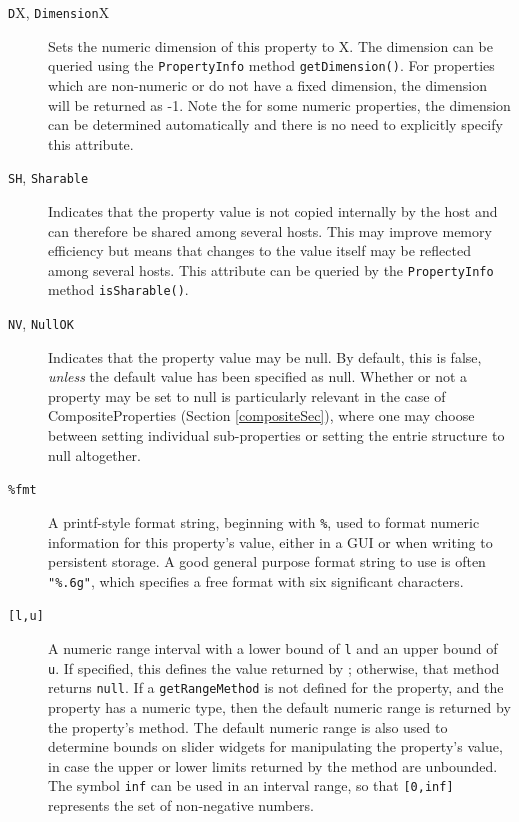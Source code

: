 \documentclass{article}
\begin{document}
\begin{description}
\item[{\tt D}X, {\tt Dimension}X] \mbox{}

Sets the numeric dimension of this
property to X. The dimension can be queried using the 
{\tt PropertyInfo} method {\tt getDimension()}. For properties which are
non-numeric or do not have a fixed dimension, the dimension will be
returned as -1. Note the for some numeric properties, the dimension
can be determined automatically and there is no need to explicitly
specify this attribute.

\item[{\tt SH}, {\tt Sharable}] \mbox{}

Indicates that the property value is
not copied internally by the host and can therefore be shared among
several hosts. This may improve memory efficiency but means that
changes to the value itself may be reflected among several hosts.
This attribute can be queried by the {\tt PropertyInfo} method 
{\tt isSharable()}.

\item[{\tt NV}, {\tt NullOK}] \mbox{}

Indicates that the property value 
may be null. By default, this is false, {\it unless} the
default value has been specified as null. Whether
or not a property may be set to null is particularly
relevant in the case of CompositeProperties (Section \ref{compositeSec}),
where one may choose between setting individual sub-properties or
setting the entrie structure to null altogether.

\item[{\tt \%fmt} ] \mbox{}

A printf-style format string, beginning with {\tt \%}, used to
format numeric information for this property's value, either in a GUI
or when writing to persistent storage. A good general purpose format
string to use is often {\tt "\%.6g"}, which specifies a free format with
six significant characters.

\item[{\tt [l,u]} ] \mbox{}

A numeric range interval with a lower bound of {\tt l} and an
upper bound of {\tt u}. If specified, this defines the value returned by
; otherwise, that method
returns {\tt null}. If a {\tt getRangeMethod} is not defined for the property,
and the property has a numeric type, then the default numeric range is
returned by the property's  method. The
default numeric range is also used to determine bounds on slider
widgets for manipulating the property's value, in case the upper or
lower limits returned by the  method are
unbounded.  The symbol {\tt inf} can be used in an interval range, so that
{\tt [0,inf]} represents the set of non-negative numbers.

\end{description}
\end{document}
